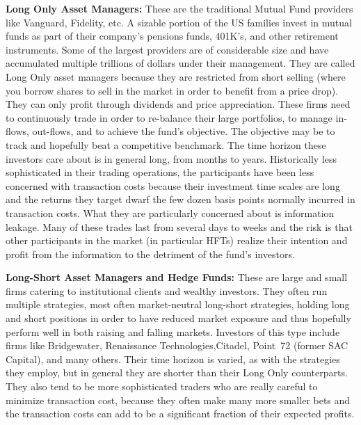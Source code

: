 \noindent\textbf{Long Only Asset Managers:} These are the traditional Mutual Fund providers like Vanguard, Fidelity, etc. A sizable portion of the US families invest in mutual funds as part of their company's pensions funds, 401K's, and other retirement instruments. Some of the largest providers are of considerable size and have accumulated multiple trillions of dollars under their management. They are called Long Only asset managers because they are restricted from short selling (where you borrow shares to sell in the market in order to benefit from a price drop). They can only profit through dividends and price appreciation. These firms need to continuously trade in order to re-balance their large portfolios, to manage in-flows, out-flows, and to achieve the fund's objective. The objective may be to track and hopefully beat a competitive benchmark. The time horizon these investors care about is in general long, from months to years. Historically less sophisticated in their trading operations, the participants have been less concerned with transaction costs because their investment time scales are long and the returns they target dwarf the few dozen basis points normally incurred in transaction costs. What they are particularly concerned about is information leakage. Many of these trades last from several days to weeks and the risk is that other participants in the market (in particular HFTs) realize their intention and profit from the information to the detriment of the fund's investors. \twomedskip


\noindent\textbf{Long-Short Asset Managers and Hedge Funds:} These are large and small firms catering to institutional clients and wealthy investors. They often run multiple strategies, most often market-neutral long-short strategies, holding long and short positions in order to have reduced market exposure and  thus hopefully perform well in both raising and falling markets. Investors of this type include firms like Bridgewater, Renaissance Technologies,Citadel, Point~72 (former SAC Capital), and many others. Their time horizon is varied, as with the strategies they employ, but in general they are shorter than their Long Only counterparts. They also tend to be more sophisticated traders who are really careful to minimize transaction cost, because they often make many more smaller bets and the transaction costs can add to be a significant fraction of their expected profits. \twomedskip


